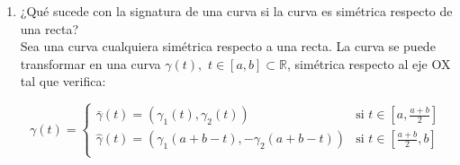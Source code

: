\documentclass[12pt,a4paper]{article}
\newcommand{\todo}[1]{{\large \color{red} \textbf{TODO: }#1 }}
\begin{document}
\begin{enumerate}
\item ¿Qué sucede con la signatura de una curva si la curva es simétrica
  respecto de una recta? \\
  Sea una curva cualquiera simétrica respecto a una recta. La curva se
  puede transformar en una curva
  $\gamma(t),\,\, t\in[a,b]\subset\mathbb{R}$, simétrica respecto al eje OX
  tal que verifica:

  $$\gamma(t)=\left\{
    \begin{array}{ll}
      \bar{\gamma}(t)=(\gamma_{1}(t), \gamma_{2}(t)) & \mbox{si } t\in[a, \frac{a+b}{2}] \\
      \hat{\gamma}(t)=(\gamma_{1}(a+b-t), -\gamma_{2}(a+b-t)) & \mbox{si }
                                                                t\in[
                                                                \frac{a+b}{2},
                                                                b]\\
    \end{array}
  \right.$$


\end{enumerate}
\end{document}
